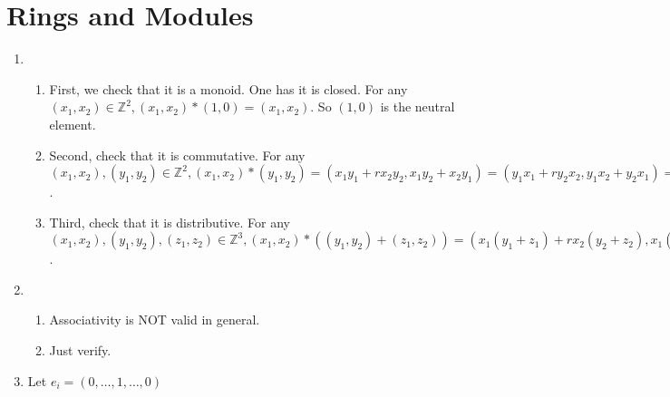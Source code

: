 \documentclass[12pt]{article}
\newcommand{\ZZ}{\mathbb{Z}}
\begin{document}
\section{Rings and Modules}
\begin{enumerate}
    \item 
        \begin{enumerate}
            \item First, we check that it is a monoid. \newline One has it is closed. For any $(x_1,x_2)\in \ZZ^2, (x_1,x_2)*(1,0)=(x_1,x_2)$. So $(1,0)$ is the neutral element.
            \item Second, check that it is commutative. \newline For any $(x_1,x_2),(y_1,y_2)\in \ZZ^2, (x_1,x_2)*(y_1,y_2)=(x_1y_1+rx_2y_2,x_1y_2+x_2y_1)=(y_1x_1+ry_2x_2,y_1x_2+y_2x_1)=(y_1,y_2)*(x_1,x_2)$.
            \item Third, check that it is distributive. \newline For any $(x_1,x_2),(y_1,y_2),(z_1,z_2)\in \ZZ^3, (x_1,x_2)*((y_1,y_2)+(z_1,z_2))=(x_1(y_1+z_1)+rx_2(y_2+z_2),x_1(y_2+z_2)+x_2(y_1+z_1))=(x_1,x_2)*(y_1,y_2)+(x_1,x_2)*(z_1,z_2)$. 
        \end{enumerate}
    \item
        \begin{enumerate}
            \item Associativity is NOT valid in general.
            \item Just verify.
        \end{enumerate}
    \item Let $e_i=(0,\dots,1,\dots,0)$
\end{enumerate}
\end{document}
